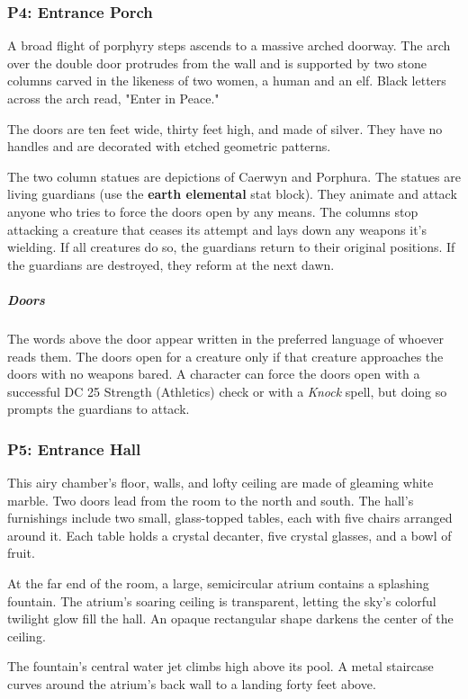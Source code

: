 \documentclass[10pt,a4paper,twoside,bg=print,twocolumn,openany,nodeprecatedcode]{dndbook}
\begin{document}
\subsubsection{P4: Entrance Porch}
\begin{DndReadAloud}{}
A broad flight of porphyry steps ascends to a massive arched doorway. The arch over the double door protrudes from the wall and is supported by two stone columns carved in the likeness of two women, a human and an elf. Black letters across the arch read, "Enter in Peace."

The doors are ten feet wide, thirty feet high, and made of silver. They have no handles and are decorated with etched geometric patterns.

\end{DndReadAloud}

The two column statues are depictions of Caerwyn and Porphura. The statues are living guardians (use the \textbf{earth elemental} stat block). They animate and attack anyone who tries to force the doors open by any means. The columns stop attacking a creature that ceases its attempt and lays down any weapons it's wielding. If all creatures do so, the guardians return to their original positions. If the guardians are destroyed, they reform at the next dawn.

\subparagraph{Doors}
The words above the door appear written in the preferred language of whoever reads them. The doors open for a creature only if that creature approaches the doors with no weapons bared. A character can force the doors open with a successful DC 25 Strength (Athletics) check or with a \textit{Knock} spell, but doing so prompts the guardians to attack.

\subsubsection{P5: Entrance Hall}
\begin{DndReadAloud}{}
This airy chamber's floor, walls, and lofty ceiling are made of gleaming white marble. Two doors lead from the room to the north and south. The hall's furnishings include two small, glass-topped tables, each with five chairs arranged around it. Each table holds a crystal decanter, five crystal glasses, and a bowl of fruit.

At the far end of the room, a large, semicircular atrium contains a splashing fountain. The atrium's soaring ceiling is transparent, letting the sky's colorful twilight glow fill the hall. An opaque rectangular shape darkens the center of the ceiling.

The fountain's central water jet climbs high above its pool. A metal staircase curves around the atrium's back wall to a landing forty feet above.

\end{DndReadAloud}
\end{document}
